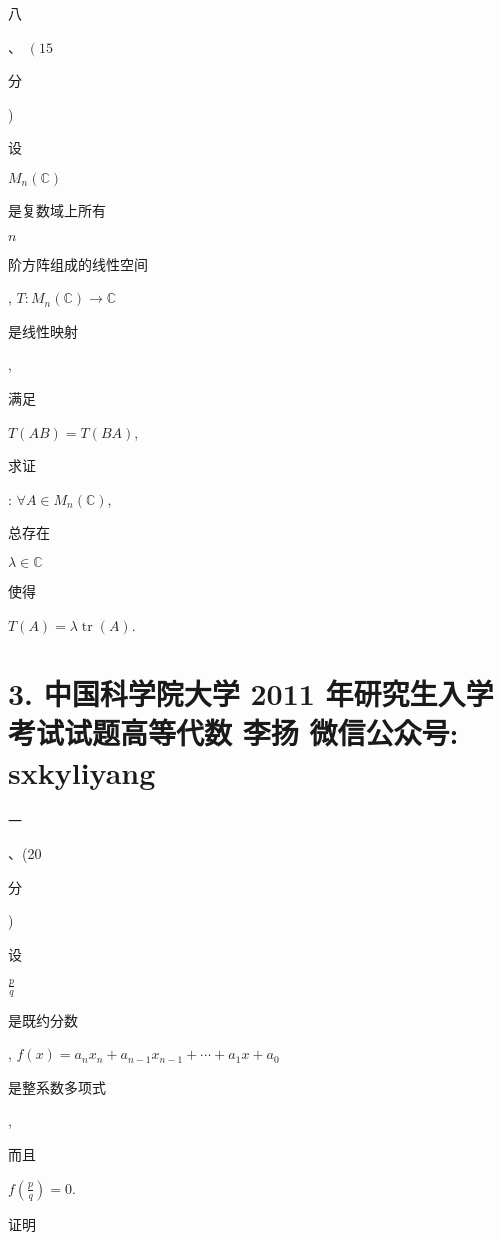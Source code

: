 \documentclass[10pt]{article}
\begin{document}
\begin{CJK}{UTF8}{mj}八\end{CJK}、 $\left(15\right.$ \begin{CJK}{UTF8}{mj}分\end{CJK}) \begin{CJK}{UTF8}{mj}设\end{CJK} $M_{n}(\mathbb{C})$ \begin{CJK}{UTF8}{mj}是复数域上所有\end{CJK} $n$ \begin{CJK}{UTF8}{mj}阶方阵组成的线性空间\end{CJK}, $T: M_{n}(\mathbb{C}) \rightarrow \mathbb{C}$ \begin{CJK}{UTF8}{mj}是线性映射\end{CJK}, \begin{CJK}{UTF8}{mj}满足\end{CJK} $T(A B)=T(B A)$, \begin{CJK}{UTF8}{mj}求证\end{CJK}: $\forall A \in M_{n}(\mathbb{C})$, \begin{CJK}{UTF8}{mj}总存在\end{CJK} $\lambda \in \mathbb{C}$ \begin{CJK}{UTF8}{mj}使得\end{CJK} $T(A)=\lambda \operatorname{tr}(A)$.

\section{3. 中国科学院大学 2011 年研究生入学考试试题高等代数 李扬 
 微信公众号: sxkyliyang}
\begin{CJK}{UTF8}{mj}一\end{CJK}、(20 \begin{CJK}{UTF8}{mj}分\end{CJK}) \begin{CJK}{UTF8}{mj}设\end{CJK} $\frac{p}{q}$ \begin{CJK}{UTF8}{mj}是既约分数\end{CJK}, $f(x)=a_{n} x_{n}+a_{n-1} x_{n-1}+\cdots+a_{1} x+a_{0}$ \begin{CJK}{UTF8}{mj}是整系数多项式\end{CJK}, \begin{CJK}{UTF8}{mj}而且\end{CJK} $f\left(\frac{p}{q}\right)=0$. \begin{CJK}{UTF8}{mj}证明\end{CJK}
\end{document}

